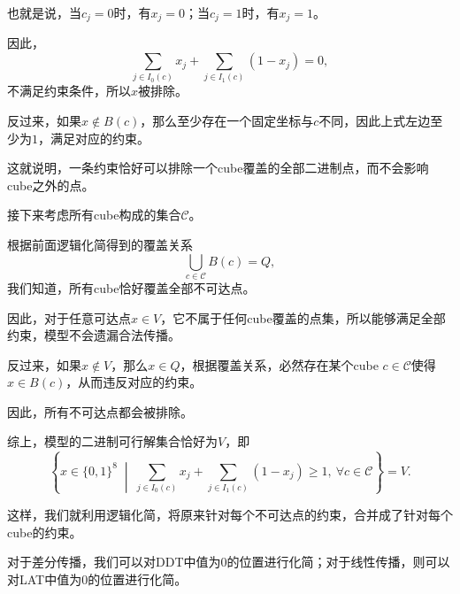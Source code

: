 也就是说，当$c_j=0$时，有$x_j=0$；当$c_j=1$时，有$x_j=1$。

因此，
\[
\sum_{j\in I_0(c)}x_j
+\sum_{j\in I_1(c)}(1-x_j)=0,
\]
不满足约束条件，所以$x$被排除。

反过来，如果$x\notin B(c)$，那么至少存在一个固定坐标与$c$不同，因此上式左边至少为$1$，满足对应的约束。

这就说明，一条约束恰好可以排除一个cube覆盖的全部二进制点，而不会影响cube之外的点。

接下来考虑所有cube构成的集合$\mathcal C$。

根据前面逻辑化简得到的覆盖关系
\[
\bigcup_{c\in\mathcal C}B(c)=Q,
\]
我们知道，所有cube恰好覆盖全部不可达点。

因此，对于任意可达点$x\in V$，它不属于任何cube覆盖的点集，所以能够满足全部约束，模型不会遗漏合法传播。

反过来，如果$x\notin V$，那么$x\in Q$，根据覆盖关系，必然存在某个cube $c\in\mathcal C$使得$x\in B(c)$，从而违反对应的约束。

因此，所有不可达点都会被排除。

综上，模型的二进制可行解集合恰好为$V$，即
\[
\left\{
x\in\{0,1\}^{8}\;\middle|\;
\sum_{j\in I_0(c)}x_j+
\sum_{j\in I_1(c)}(1-x_j)\ge1,
\ \forall c\in\mathcal C
\right\}=V.
\]

这样，我们就利用逻辑化简，将原来针对每个不可达点的约束，合并成了针对每个cube的约束。

对于差分传播，我们可以对DDT中值为$0$的位置进行化简；对于线性传播，则可以对LAT中值为$0$的位置进行化简。
